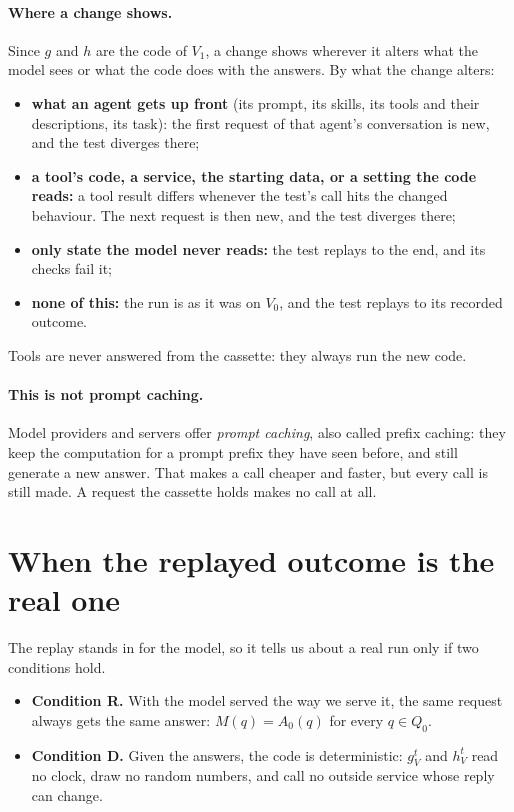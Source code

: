 \documentclass[11pt,a4paper]{article}
\begin{document}
\paragraph{Where a change shows.} Since $g$ and $h$ are the code of $V_1$, a change shows wherever it alters what
the model sees or what the code does with the answers. By what the change alters:
\begin{itemize}
  \item \textbf{what an agent gets up front} (its prompt, its skills, its tools and their descriptions, its task):
        the first request of that agent's conversation is new, and the test diverges there;
  \item \textbf{a tool's code, a service, the starting data, or a setting the code reads:} a tool result differs
        whenever the test's call hits the changed behaviour. The next request is then new, and the test diverges
        there;
  \item \textbf{only state the model never reads:} the test replays to the end, and its checks fail it;
  \item \textbf{none of this:} the run is as it was on $V_0$, and the test replays to its recorded outcome.
\end{itemize}
Tools are never answered from the cassette: they always run the new code.

\paragraph{This is not prompt caching.} Model providers and servers offer \emph{prompt caching}, also called
prefix caching: they keep the computation for a prompt prefix they have seen before, and still generate a new
answer. That makes a call cheaper and faster, but every call is still made. A request the cassette holds makes no
call at all.

\section{When the replayed outcome is the real one}
\label{sec:conditions}

The replay stands in for the model, so it tells us about a real run only if two conditions hold.
\begin{itemize}
  \item \textbf{Condition R.} With the model served the way we serve it, the same request always gets the same
        answer: $M(q) = A_0(q)$ for every $q \in Q_0$.
  \item \textbf{Condition D.} Given the answers, the code is deterministic: $g^t_V$ and $h^t_V$ read no clock,
        draw no random numbers, and call no outside service whose reply can change.
\end{itemize}
\end{document}

